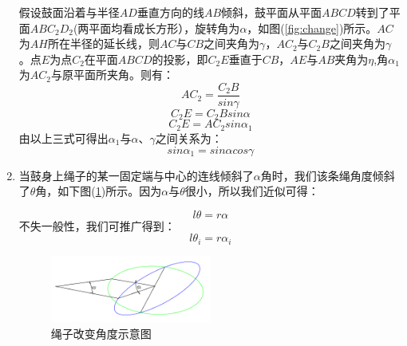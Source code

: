 \documentclass{cumcm}
\begin{document}
\begin{enumerate}
\quad \quad
假设鼓面沿着与半径$AD$垂直方向的线$AB$倾斜，鼓平面从平面$ABCD$转到了平面$ABC_2D_2$(两平面均看成长方形），旋转角为$\alpha$，如图(\ref{fig:change})所示。$AC$为$AH$所在半径的延长线，则$AC$与$CB$之间夹角为$\gamma$，$AC_2$与$C_2B$之间夹角为$\gamma$。点$E$为点$C_2$在平面$ABCD$的投影，即$C_2E$垂直于$CB$，$AE$与$AB$夹角为$\eta$,角$\alpha_1$为$AC_2$与原平面所夹角。则有：\\
\begin{displaymath}
AC_2=\frac{C_2B}{sin\gamma}
\end{displaymath}
\begin{displaymath}
C_2E=C_2Bsin\alpha
\end{displaymath}
\begin{displaymath}
C_2E=AC_2sin\alpha_1
\end{displaymath}
由以上三式可得出$\alpha_1$与$\alpha$、$\gamma$之间关系为：
\begin{equation}
sin\alpha_1=sin\alpha cos\gamma
\end{equation}

\item 当鼓身上绳子的某一固定端与中心的连线倾斜了$\alpha$角时，我们该条绳角度倾斜了$\theta$角，如下图(\ref{fig:angel})所示。因为$\alpha$与$\theta$很小，所以我们近似可得：

\begin{displaymath}
l\theta=r\alpha
\end{displaymath}
不失一般性，我们可推广得到：
\begin{equation}
l\theta_i=r\alpha_i
\end{equation}
\begin{figure}[H]
\centering
\includegraphics[width=0.5\textwidth]{img/angel.png}
\caption{绳子改变角度示意图}\label{fig:angel}
\end{figure}


\end{enumerate}
\end{document}
